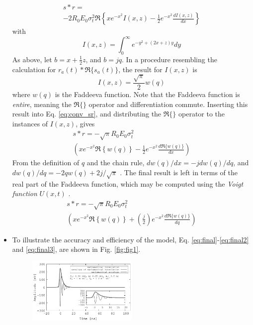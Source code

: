 \documentclass[amsmath,amssymb,aps,prd,10pt,twocolumn,showkeys]{revtex4}
\begin{document}
\begin{itemize}
\begin{multline}
s * r = \\ -2R_0 E_0 \sigma_t^2 \Re\left\lbrace xe^{-x^2}I(x,z) - \frac{1}{2}e^{-x^2} \frac{dI(x,z)}{dx} \right\rbrace \label{eq:conv_sr}
\end{multline}
with
\begin{equation}
I(x,z) = \int_0^{\infty} e^{-y^2 + (2x + z)y}dy
\end{equation}
As above, let $b=x+\frac{1}{2}z$, and $b = j q$.  In a procedure resembling the calculation for $r_a(t) * \Re\lbrace s_a(t)\rbrace$, the result for $I(x,z)$ is
\begin{equation}
I(x,z) = \frac{\sqrt{\pi}}{2} w(q)
\end{equation}
where $w(q)$ is the Faddeeva function.  Note that the Faddeeva function is \textit{entire}, meaning the $\Re\lbrace \rbrace$ operator and differentiation commute.  Inserting this result into Eq. \ref{eq:conv_sr}, and distributing the $\Re\lbrace \rbrace$ operator to the instances of $I(x,z)$, gives
\begin{multline}
s * r = -\sqrt{\pi}R_0 E_0 \sigma_t^2 \\ \left(xe^{-x^2} \Re\left\lbrace w(q)\right\rbrace - \frac{1}{2}e^{-x^2} \frac{d\Re\lbrace w(q)\rbrace}{dx} \right)
\end{multline}
From the definition of $q$ and the chain rule, $dw(q)/dx = -jdw(q)/dq$, and $dw(q)/dq = -2qw(q)+2j/\sqrt{\pi}$ \cite{NIST:DLMF}.  The final result is left in terms of the real part of the Faddeeva function, which may be computed using the \textit{Voigt function} $U(x,t)$ \cite{NIST:DLMF,PhysRevD.105.123019}.
\begin{multline}
s * r = -\sqrt{\pi}R_0 E_0 \sigma_t^2 \\ \left(xe^{-x^2} \Re\left\lbrace w(q)\right\rbrace + \left(\frac{j}{2}\right)e^{-x^2} \frac{d\Re\lbrace w(q)\rbrace}{dq} \right) \label{eq:final3}
\end{multline}
\item To illustrate the accuracy and efficiency of the model, Eq. \ref{eq:final}-\ref{eq:final2} and \ref{eq:final3}, are shown in Fig. \ref{fig:fig1}.
\begin{figure}
\centering
\includegraphics[width=0.5\textwidth]{July3rd_plot1.pdf}

\end{figure}
\end{itemize}
\end{document}
